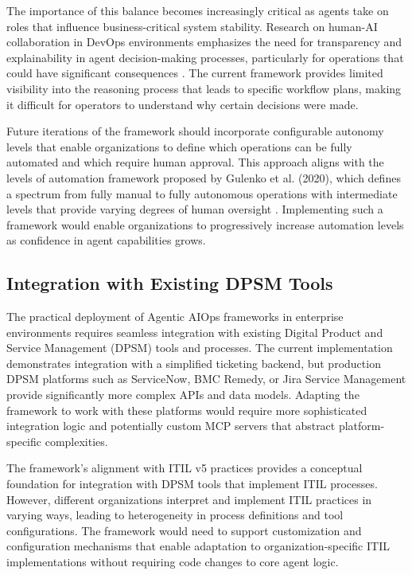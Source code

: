 \documentclass{article}
\begin{document}
The importance of this balance becomes increasingly critical as agents take on roles that influence business-critical system stability. Research on human-AI collaboration in DevOps environments emphasizes the need for transparency and explainability in agent decision-making processes, particularly for operations that could have significant consequences \cite{johnson2024}. The current framework provides limited visibility into the reasoning process that leads to specific workflow plans, making it difficult for operators to understand why certain decisions were made.

Future iterations of the framework should incorporate configurable autonomy levels that enable organizations to define which operations can be fully automated and which require human approval. This approach aligns with the levels of automation framework proposed by Gulenko et al. (2020), which defines a spectrum from fully manual to fully autonomous operations with intermediate levels that provide varying degrees of human oversight \cite{gulenko2020}. Implementing such a framework would enable organizations to progressively increase automation levels as confidence in agent capabilities grows.

\subsection{Integration with Existing DPSM Tools}

The practical deployment of Agentic AIOps frameworks in enterprise environments requires seamless integration with existing Digital Product and Service Management (DPSM) tools and processes. The current implementation demonstrates integration with a simplified ticketing backend, but production DPSM platforms such as ServiceNow, BMC Remedy, or Jira Service Management provide significantly more complex APIs and data models. Adapting the framework to work with these platforms would require more sophisticated integration logic and potentially custom MCP servers that abstract platform-specific complexities.

The framework's alignment with ITIL v5 practices provides a conceptual foundation for integration with DPSM tools that implement ITIL processes. However, different organizations interpret and implement ITIL practices in varying ways, leading to heterogeneity in process definitions and tool configurations. The framework would need to support customization and configuration mechanisms that enable adaptation to organization-specific ITIL implementations without requiring code changes to core agent logic.
\end{document}

